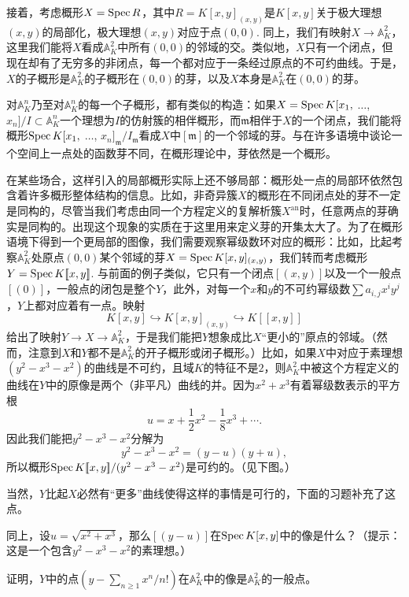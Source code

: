 接着，考虑概形$X=\operatorname{Spec} R$，其中$R=K[x,y]_{(x,y)}$是$K[x,y]$关于极大理想$(x,y)$的局部化，极大理想$(x,y)$对应于点$(0,0)$. 同上，我们有映射$X\to \mathbb{A}_K^2$，这里我们能将$X$看成$\mathbb{A}_K^2$中所有$(0,0)$的邻域的交。类似地，$X$只有一个闭点，但现在却有了无穷多的非闭点，每一个都对应于一条经过原点的不可约曲线。于是，$X$的子概形是$\mathbb{A}_K^2$的子概形在$(0,0)$的芽，以及$X$本身是$\mathbb{A}_K^2$在$(0,0)$的芽。

对$\mathbb{A}_K^n$乃至对$\mathbb{A}_K^n$的每一个子概形，都有类似的构造：如果$X=\operatorname{Spec} K[x_1,$ $\dots$, $x_n]/I\subset \mathbb{A}_K^n$一个理想为$I$的仿射簇的相伴概形，而$\mathfrak{m}$相伴于$X$的一个闭点，我们能将概形$\operatorname{Spec} K[x_1,$ $\dots$, $x_n]_\mathfrak{m}/I_{\mathfrak{m}}$看成$X$中$[\mathfrak{m}]$的一个邻域的芽。与在许多语境中谈论一个空间上一点处的函数芽不同，在概形理论中，芽依然是一个概形。

在某些场合，这样引入的局部概形实际上还不够局部：概形处一点的局部环依然包含着许多概形整体结构的信息。比如，非奇异簇$X$的概形在不同闭点处的芽不一定是同构的，尽管当我们考虑由同一个方程定义的复解析簇$X^{\text{an}}$时，任意两点的芽确实是同构的。出现这个现象的实质在于这里用来定义芽的开集太大了。为了在概形语境下得到一个更局部的图像，我们需要观察幂级数环对应的概形：比如，比起考察$\mathbb{A}_K^2$处原点$(0,0)$某个邻域的芽$X=\operatorname{Spec} K[x,y]_{(x,y)}$，我们转而考虑概形$Y=\operatorname{Spec} K [\![x,y]\!]$. 与前面的例子类似，它只有一个闭点$[(x,y)]$以及一个一般点$[(0)]$，一般点的闭包是整个$Y$，此外，对每一个$x$和$y$的不可约幂级数$\sum a_{i,j}x^iy^j$，$Y$上都对应着有一点。映射
\[
	K[x,y]\hookrightarrow K[x,y]_{(x,y)}\hookrightarrow K[\![x,y]\!]
\]
给出了映射$Y\to X\to \mathbb{A}_K^2$，于是我们能把$Y$想象成比$X$“更小的”原点的邻域。（然而，注意到$X$和$Y$都不是$\mathbb{A}_K^2$的开子概形或闭子概形。）比如，如果$X$中对应于素理想$(y^2-x^3-x^2)$的曲线是不可约，且域$K$的特征不是$2$，则$\mathbb{A}_K^2$中被这个方程定义的曲线在$Y$中的原像是两个（非平凡）曲线的并。因为$x^2+x^3$有着幂级数表示的平方根
\[
	u=x+\frac{1}{2}x^2-\frac{1}{8}x^3+\cdots.
\]
因此我们能把$y^2-x^3-x^2$分解为
\[
	y^2-x^3-x^2=(y-u)(y+u),
\]
所以概形$\operatorname{Spec}  K[\![x,y]\!]/(y^2-x^3-x^2)$是可约的。（见下图。）


当然，$Y$比起$X$必然有“更多”曲线使得这样的事情是可行的，下面的习题补充了这点。

\begin{exe}
	\begin{compactenum}[(a)]
		\item 同上，设$u=\sqrt{x^2+x^3}$，那么$[(y-u)]$在$\operatorname{Spec} K[x,y]$中的像是什么？（提示：这是一个包含$y^2-x^3-x^2$的素理想。）
		\item 证明，$Y$中的点$(y-\sum_{n\geq 1}x^n/n!)$在$\mathbb{A}_K^2$中的像是$\mathbb{A}_K^2$的一般点。
	\end{compactenum}
\end{exe}

